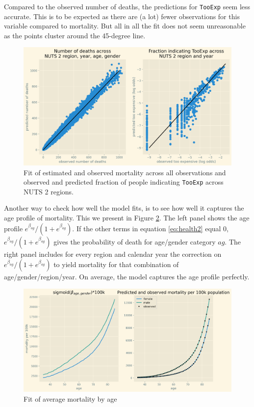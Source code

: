 \documentclass[a4paper,12pt]{article}
\begin{document}
Compared to the observed number of deaths, the predictions for \texttt{TooExp} seem less accurate. This is to be expected as there are (a lot) fewer observations for this variable compared to mortality. But all in all the fit does not seem unreasonable as the points cluster around the 45-degree line.


\begin{figure}[htbp]
\centering
\includegraphics[width=.9\linewidth]{./figures/fit_baseline_model.png}
\caption{\label{fig:ModelFit}Fit of estimated and observed mortality across all observations and observed and predicted fraction of people indicating \texttt{TooExp} across NUTS 2 regions.}
\end{figure}

Another way to check how well the model fits, is to see how well it captures the age profile of mortality. This we present in Figure \ref{fig:Fit_mortality_by_age}. The left panel shows the age profile \(e^{\beta_{ag}}/(1+e^{\beta_{ag}})\). If the other terms in equation \eqref{eq:health2} equal 0, \(e^{\beta_{ag}}/(1+e^{\beta_{ag}})\) gives the probability of death for age/gender category \(ag\). The right panel includes for every region and calendar year the correction on \(e^{\beta_{ag}}/(1+e^{\beta_{ag}})\) to yield mortality for that combination of age/gender/region/year. On average, the model captures the age profile perfectly.


\begin{figure}[htbp]
\centering
\includegraphics[width=.9\linewidth]{./figures/age_profile_baseline.png}
\caption{\label{fig:Fit_mortality_by_age}Fit of average mortality by age}
\end{figure}
\end{document}
